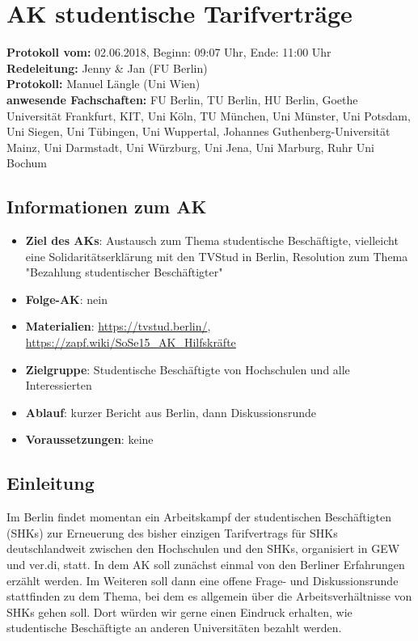
\section{AK studentische Tarifverträge}

	\textbf{Protokoll vom:} 02.06.2018,
	Beginn: 09:07 Uhr,
	Ende: 11:00 Uhr \\
	\textbf{Redeleitung:} Jenny \& Jan (FU Berlin) \\
	\textbf{Protokoll:} Manuel Längle (Uni Wien) \\
	\textbf{anwesende Fachschaften:} FU Berlin, TU Berlin, HU Berlin, Goethe Universität Frankfurt, KIT, Uni Köln, TU München, Uni Münster, Uni Potsdam, Uni Siegen, Uni Tübingen, Uni Wuppertal, Johannes Guthenberg-Universität Mainz, Uni Darmstadt, Uni Würzburg, Uni Jena, Uni Marburg, Ruhr Uni Bochum

	\subsection*{Informationen zum AK}
		\begin{itemize}
			\item \textbf{Ziel des AKs}: Austausch zum Thema studentische Beschäftigte, vielleicht eine Solidaritätserklärung mit den TVStud in Berlin, Resolution zum Thema "Bezahlung studentischer Beschäftigter"
			\item \textbf{Folge-AK}: nein
      \item \textbf{Materialien}: \url{https://tvstud.berlin/}, \url{https://zapf.wiki/SoSe15_AK_Hilfskräfte}
			\item \textbf{Zielgruppe}: Studentische Beschäftigte von Hochschulen und alle Interessierten
			\item \textbf{Ablauf}: kurzer Bericht aus Berlin, dann Diskussionsrunde
			\item \textbf{Voraussetzungen}: keine
		\end{itemize}

  \subsection*{Einleitung}
    Im Berlin findet momentan ein Arbeitskampf der studentischen Beschäftigten (SHKs) zur Erneuerung des bisher einzigen Tarifvertrags für SHKs deutschlandweit zwischen den Hochschulen und den SHKs, organisiert in GEW und ver.di, statt. In dem AK soll zunächst einmal von den Berliner Erfahrungen erzählt werden. Im Weiteren soll dann eine offene Frage- und Diskussionsrunde stattfinden zu dem Thema, bei dem es allgemein über die Arbeitsverhältnisse von SHKs gehen soll. Dort würden wir gerne einen Eindruck erhalten, wie studentische Beschäftigte an anderen Universitäten bezahlt werden.

